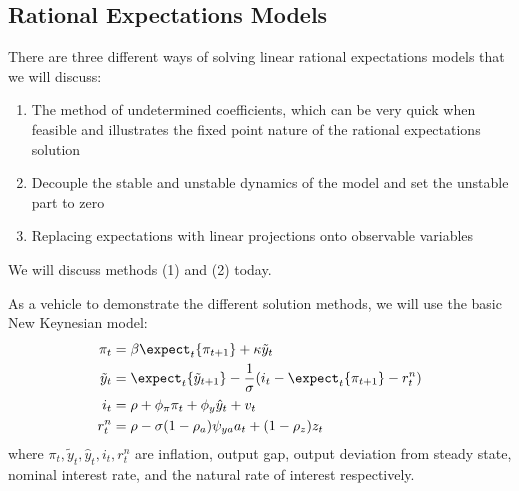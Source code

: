 \documentclass[10pt]{article}
\begin{document}
\subsection{Rational Expectations Models}\label{subsec:5}

\begin{remark}
	There are three different ways of solving linear rational expectations models that we will discuss:
	\begin{enumerate}
		\item The method of undetermined coefficients, which can be very quick when feasible and illustrates the fixed point nature of the rational expectations solution
		\item Decouple the stable and unstable dynamics of the model and set the unstable part to zero
		\item Replacing expectations with linear projections onto observable variables 
	\end{enumerate}
	We will discuss methods (1) and (2) today.
\end{remark}

As a vehicle to demonstrate the different solution methods, we will use the basic New Keynesian model:
\begin{align*}
	\pi_t &= \beta \expect_t \{\pi_{t+1}\} + \kappa \tilde{y}_t \\
	\tilde{y}_t &=  \expect_t \{\tilde{y}_{t+1}\}- \frac{1}{\sigma} (i_t - \expect_t\{\pi_{t+1}\}- r_t^n) \\
	i_t &= \rho + \phi_\pi \pi_t + \phi_y \hat{y}_t + v_t \\
	r_t^n &= \rho - \sigma(1-\rho_a) \psi_{ya}a_t + (1-\rho_z)z_t
\end{align*}
where $\pi_t,\tilde{y}_t,\hat{y}_t,i_t,r_t^n$ are inflation, output gap, output deviation from steady state, nominal interest rate, and the natural rate of interest respectively. 
\end{document}
